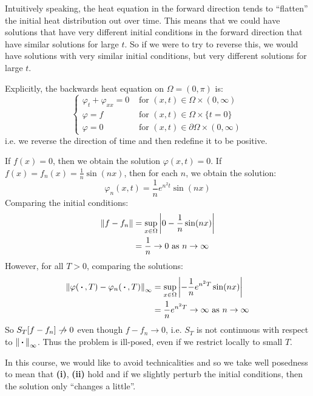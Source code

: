 \documentclass[../main.tex]{subfiles}
\begin{document}
\begin{example}
  Intuitively speaking, the heat equation in the forward direction tends to ``flatten'' the initial heat distribution out over time.
  This means that we could have solutions that have very different initial conditions in the forward direction that have similar solutions for large $t$.
  So if we were to try to reverse this, we would have solutions with very similar initial conditions, but very different solutions for large $t$.

  Explicitly, the backwards heat equation on $\Omega = (0, \pi)$ is:
  \[
    \begin{cases}
    \varphi_{t} + \varphi_{x x} = 0 & \text{ for } (x, t) \in \Omega \times (0, \infty) \\
    \varphi = f & \text{ for } (x, t) \in \Omega \times \{t = 0\} \\
    \varphi = 0 & \text{ for } (x, t) \in \partial \Omega \times (0, \infty)
    \end{cases}
  \]
  i.e. we reverse the direction of time and then redefine it to be positive.

  If $f(x) = 0$, then we obtain the solution $\varphi(x, t) = 0$.
  If $f(x) = f_n(x) = \frac{1}{n} \sin(nx)$, then for each $n$, we obtain the solution:
  \[
    \varphi_n(x, t) = \frac{1}{n} e^{n^2 t}\sin(nx)
  \]
  Comparing the initial conditions:
  \begin{align*}
    \left\lVert f - f_n \right\rVert &= \sup_{x \in \Omega} \left\lvert 0 - \frac{1}{n} \sin(nx) \right\rvert \\
                   &= \frac{1}{n} \to 0 \text{ as } n \to \infty
  \end{align*}
  However, for all $T > 0$, comparing the solutions:
  \begin{align*}
    \left\lVert \varphi({\hspace{0.18em}\boldsymbol{\cdot}\hspace{0.18em}}, T) - \varphi_n({\hspace{0.18em}\boldsymbol{\cdot}\hspace{0.18em}}, T) \right\rVert_{\infty} &= \sup_{x \in \Omega} \left\lvert -\frac{1}{n}e^{n^2 T} \sin(nx) \right\rvert \\
                                                                &= \frac{1}{n} e^{n^2T} \to \infty \text{ as } n \to \infty
  \end{align*}
  So $S_T[f - f_n] \centernot\to 0$ even though $f - f_n \to 0$, i.e. $S_T$ is not continuous with respect to $\left\lVert {\hspace{0.18em}\boldsymbol{\cdot}\hspace{0.18em}} \right\rVert_{\infty}$.
  Thus the problem is ill-posed, even if we restrict locally to small $T$.
\end{example}
In this course, we would like to avoid technicalities and so we take well posedness to mean that \textbf{(i)}, \textbf{(ii)} hold and if we slightly perturb the initial conditions, then the solution only ``changes a little''.
\end{document}
